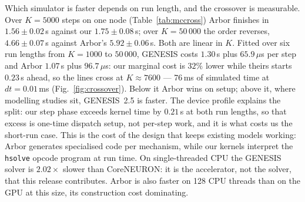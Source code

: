 \documentclass[preprint,12pt, a4paper]{elsarticle}
\begin{document}
\begin{enumerate}
Which simulator is faster depends on run length, and the crossover is measurable. Over $K=5000$ steps on one node (Table~\ref{tab:mccross}) Arbor finishes in $1.56\pm0.02$\,s against our $1.75\pm0.08$\,s; over $K=50\,000$ the order reverses, $4.66\pm0.07$\,s against Arbor's $5.92\pm0.06$\,s. Both are linear in $K$. Fitted over six run lengths from $K=1000$ to $50\,000$, GENESIS costs $1.30$\,s plus $65.9\,\mu$s per step and Arbor $1.07$\,s plus $96.7\,\mu$s: our marginal cost is $32\%$ lower while theirs starts $0.23$\,s ahead, so the lines cross at $K\approx7600$ --- 76\,ms of simulated time at $dt=0.01$\,ms (Fig.~\ref{fig:crossover}). Below it Arbor wins on setup; above it, where modelling studies sit, GENESIS~2.5 is faster. The device profile explains the split: our step phase exceeds kernel time by $0.21$\,s at both run lengths, so that excess is one-time dispatch setup, not per-step work, and it is what costs us the short-run case.  This is the cost of the design that keeps existing models working: Arbor generates specialised code per mechanism, while our kernels interpret the \texttt{hsolve} opcode program at run time. On single-threaded CPU the GENESIS solver is $2.02\times$ slower than CoreNEURON: it is the accelerator, not the solver, that this release contributes. Arbor is also faster on 128 CPU threads than on the GPU at this size, its construction cost dominating.


\end{enumerate}
\end{document}
